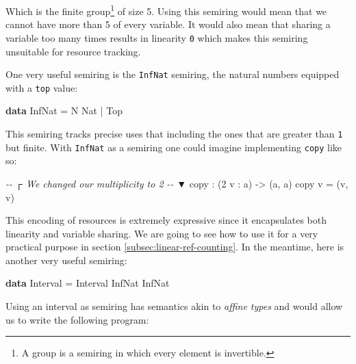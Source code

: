 \documentclass[
]{article}
\newenvironment{Shaded}{}{}
\newcommand{\CommentTok}[1]{\textcolor[rgb]{0.38,0.63,0.69}{\textit{#1}}}
\newcommand{\DataTypeTok}[1]{\textcolor[rgb]{0.56,0.13,0.00}{#1}}
\newcommand{\DecValTok}[1]{\textcolor[rgb]{0.25,0.63,0.44}{#1}}
\newcommand{\KeywordTok}[1]{\textcolor[rgb]{0.00,0.44,0.13}{\textbf{#1}}}
\newcommand{\NormalTok}[1]{#1}
\newcommand{\OperatorTok}[1]{\textcolor[rgb]{0.40,0.40,0.40}{#1}}
\newcommand{\OtherTok}[1]{\textcolor[rgb]{0.00,0.44,0.13}{#1}}
\begin{document}
Which is the finite group\footnote{A group is a semiring in which every
  element is invertible.} of size 5. Using this semiring would mean that
we cannot have more than 5 of every variable. It would also mean that
sharing a variable too many times results in linearity \texttt{0} which
makes this semiring unsuitable for resource tracking.

One very useful semiring is the \texttt{InfNat} semiring, the natural
numbers equipped with a \texttt{top} value:

\begin{Shaded}
\begin{Highlighting}[]
\KeywordTok{data} \DataTypeTok{InfNat} \OtherTok{=} \DataTypeTok{N} \DataTypeTok{Nat} \OperatorTok{|} \DataTypeTok{Top}
\end{Highlighting}
\end{Shaded}

This semiring tracks precise uses that including the ones that are
greater than \texttt{1} but finite. With \texttt{InfNat} as a semiring
one could imagine implementing \texttt{copy} like so:

\begin{Shaded}
\begin{Highlighting}[]
\CommentTok{{-}{-}      ┌ We changed our multiplicity to 2}
\CommentTok{{-}{-}      ▼}
\NormalTok{copy }\OperatorTok{:}\NormalTok{ (}\DecValTok{2}\NormalTok{ v }\OperatorTok{:}\NormalTok{ a) }\OtherTok{{-}\textgreater{}}\NormalTok{ (a, a)}
\NormalTok{copy v }\OtherTok{=}\NormalTok{ (v, v)}
\end{Highlighting}
\end{Shaded}

This encoding of resources is extremely expressive since it encapsulates
both linearity and variable sharing. We are going to see how to use it
for a very practical purpose in section
\ref{subsec:linear-ref-counting}. In the meantime, here is another very
useful semiring:

\begin{Shaded}
\begin{Highlighting}[]
\KeywordTok{data} \DataTypeTok{Interval} \OtherTok{=} \DataTypeTok{Interval} \DataTypeTok{InfNat} \DataTypeTok{InfNat}
\end{Highlighting}
\end{Shaded}

Using an interval as semiring has semantics akin to \emph{affine types}
and would allow us to write the following program:
\end{document}
